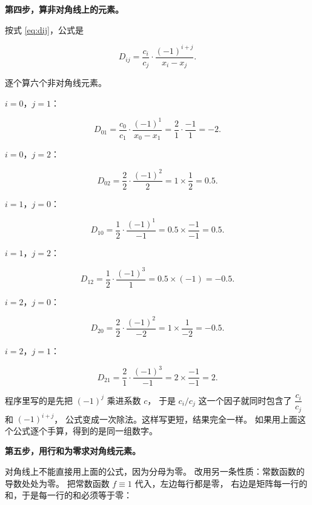 \textbf{第四步，算非对角线上的元素。}

按式 \eqref{eq:dij}，公式是

\begin{equation}
D_{ij}=\frac{c_i}{c_j}\cdot\frac{(-1)^{i+j}}{x_i-x_j}.
\end{equation}

逐个算六个非对角线元素。

$i=0$，$j=1$：

\begin{equation}
D_{01}=\frac{c_0}{c_1}\cdot\frac{(-1)^{1}}{x_0-x_1}
=\frac{2}{1}\cdot\frac{-1}{1}=-2 .
\end{equation}

$i=0$，$j=2$：

\begin{equation}
D_{02}=\frac{2}{2}\cdot\frac{(-1)^{2}}{2}=1\times\frac{1}{2}=0.5 .
\end{equation}

$i=1$，$j=0$：

\begin{equation}
D_{10}=\frac{1}{2}\cdot\frac{(-1)^{1}}{-1}=0.5\times\frac{-1}{-1}=0.5 .
\end{equation}

$i=1$，$j=2$：

\begin{equation}
D_{12}=\frac{1}{2}\cdot\frac{(-1)^{3}}{1}=0.5\times(-1)=-0.5 .
\end{equation}

$i=2$，$j=0$：

\begin{equation}
D_{20}=\frac{2}{2}\cdot\frac{(-1)^{2}}{-2}=1\times\frac{1}{-2}=-0.5 .
\end{equation}

$i=2$，$j=1$：

\begin{equation}
D_{21}=\frac{2}{1}\cdot\frac{(-1)^{3}}{-1}=2\times\frac{-1}{-1}=2 .
\end{equation}

程序里写的是先把 $(-1)^j$ 乘进系数 $c$，
于是 $c_i/c_j$ 这一个因子就同时包含了 $\dfrac{c_i}{c_j}$ 和 $(-1)^{i+j}$，
公式变成一次除法。这样写更短，结果完全一样。
如果用上面这个公式逐个手算，得到的是同一组数字。

\textbf{第五步，用行和为零求对角线元素。}

对角线上不能直接用上面的公式，因为分母为零。
改用另一条性质：常数函数的导数处处为零。
把常数函数 $f\equiv1$ 代入，左边每行都是零，
右边是矩阵每一行的和，于是每一行的和必须等于零：

